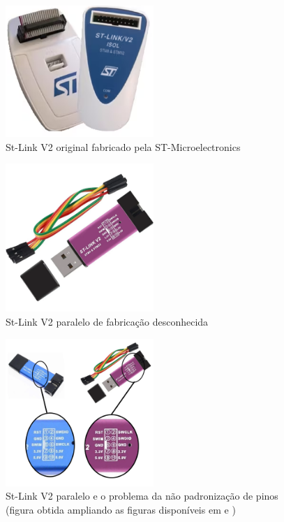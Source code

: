 \begin{figure}[ht]
	\centering
	\includegraphics[width=0.5\textwidth]{figures/stlinkv2_original}
	\caption{St-Link V2 original fabricado pela ST-Microelectronics \cite{st_link_v2}}
    \label{stlinkv2_original}
\end{figure}


\begin{figure}[ht]
	\centering
	\includegraphics[width=0.5\textwidth]{figures/stlinkv2_cheap}
	\caption{St-Link V2 paralelo de fabricação desconhecida \cite{stlinkv2_cheap_ref}}
    \label{stlinkv2_cheap}
\end{figure}


\begin{figure}[htb]
	\centering
	\includegraphics[width=0.5\textwidth]{figures/stlinkv2_cheap_pin_diff}
	\caption{St-Link V2 paralelo e o problema da não padronização de pinos
		(figura obtida ampliando as figuras disponíveis em \cite{stlinkv2_cheap_ref} e \cite{stlinkv2_cheap_pin_diff_ref})
	}
    \label{stlinkv2_cheap_pin_diff}
\end{figure}

